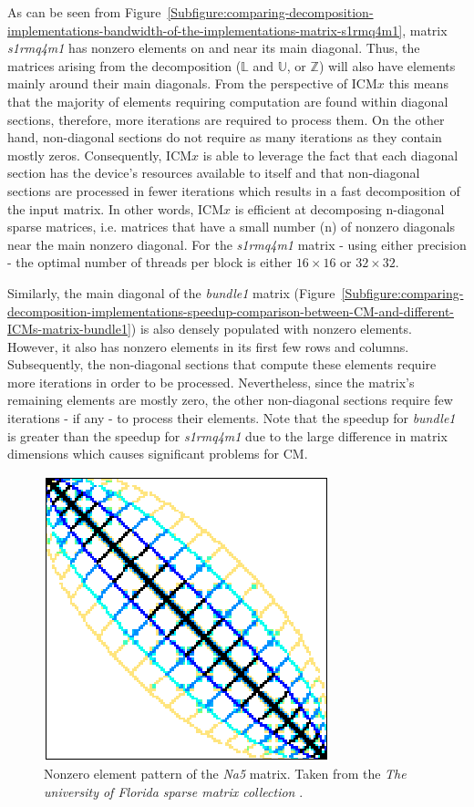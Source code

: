 \par As can be seen from Figure~\ref{Subfigure:comparing-decomposition-implementations-bandwidth-of-the-implementations-matrix-s1rmq4m1}, matrix \textit{s1rmq4m1} has nonzero elements on and near its main diagonal. Thus, the matrices arising from the decomposition ($ \mathbb{L} $ and $ \mathbb{U} $, or $ \mathbb{Z} $) will also have elements mainly around their main diagonals. From the perspective of ICM$ x $ this means that the majority of elements requiring computation are found within diagonal sections, therefore, more iterations are required to process them. On the other hand, non-diagonal sections do not require as many iterations as they contain mostly zeros. Consequently, ICM$ x $ is able to leverage the fact that each diagonal section has the device's resources available to itself and that non-diagonal sections are processed in fewer iterations which results in a fast decomposition of the input matrix. In other words, ICM$ x $ is efficient at decomposing n-diagonal sparse matrices, i.e. matrices that have a small number (n) of nonzero diagonals near the main nonzero diagonal. For the \textit{s1rmq4m1} matrix - using either precision - the optimal number of threads per block is either $ 16 \times 16 $ or $ 32 \times 32 $.
\par Similarly, the main diagonal of the \textit{bundle1} matrix (Figure~\ref{Subfigure:comparing-decomposition-implementations-speedup-comparison-between-CM-and-different-ICMs-matrix-bundle1}) is also densely populated with nonzero elements. However, it also has nonzero elements in its first few rows and columns. Subsequently, the non-diagonal sections that compute these elements require more iterations in order to be processed. Nevertheless, since the matrix's remaining elements are mostly zero, the other non-diagonal sections require few iterations - if any - to process their elements. Note that the speedup for \textit{bundle1} is greater than the speedup for \textit{s1rmq4m1} due to the large difference in matrix dimensions which causes significant problems for CM.

\begin{figure}
	\centering
	\includegraphics[width=.35\textwidth, keepaspectratio, clip]{Images/ch3/matrices/na5.png}
	\caption{Nonzero element pattern of the \textit{Na5} matrix. Taken from the \emph{The university of Florida sparse matrix collection} \cite{Davis2011}.}
	\label{Figure:comparing-decomposition-implementations-bandwidth-of-the-implementations-matrix-na5}
\end{figure}

